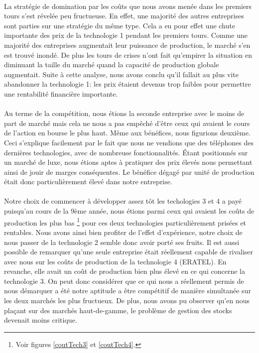 \paragraph{}
La stratégie de domination par les coûts que nous avons menée dans les premiers
tours s'est révelée peu fructueuse. En effet, une majorité des autres 
entreprises sont parties sur une stratégie du même type. Cela a eu pour effet
une chute importante des prix de la technologie 1 pendant les premiers tours. 
Comme une majorité des entreprises augmentait leur puissance de production, 
le marché s'en est trouvé inondé. De plus les tours de crises n'ont fait
qu'empirer la situation en diminuant la taille du marché quand la capacité de
production globale augmentait. Suite à cette analyse, nous avons conclu qu'il 
fallait au plus vite abandonner la technologie 1: les prix étaient devenus trop 
faibles pour permettre une rentabilité financière importante.

\paragraph{}
Au terme de la compétition, nous étions la seconde entreprise avec le moins de
part de marché mais cela ne nous a pas empêché d'être ceux qui avaient le
cours de l'action en bourse le plus haut. Même aux bénéfices, nous figurions
deuxième. Ceci s'explique facilement par le fait que nous ne vendions que des
téléphones des dernières technologies, avec de nombreuse fonctionnalités.
Étant positionnés sur un marché de luxe, nous étions aptes à pratiquer des
prix élevés nous permettant ainsi de jouir de marges conséquentes. Le bénéfice
dégagé par unité de production était donc particulièrement élevé dans notre
entreprise.

\paragraph{}
Notre choix de commencer à développer assez tôt les techologies 3 et 4 a payé
puisqu'au cours de la 9ème année, nous étions parmi ceux qui avaient les coûts
de production les plus bas
\footnote{Voir figures \ref{coutTech3} et \ref{coutTech4}.}
pour ces deux technologies particulièrement prisées et rentables. Nous avons
ainsi bien profiter de l'effet d'expérience, notre choix de nous passer de la
technologie 2 semble donc avoir porté ses fruits. Il est aussi possible de
remarquer qu'une seule entreprise était réellement capable de rivaliser avec
nous sur les coûts de production de la technologie 4 (ERATEL). En revanche,
elle avait un coût de production bien plus élevé en ce qui concerne la
technologie 3. On peut donc considérer que ce qui nous a réellement permis de
nous démarquer a été notre aptitude a être compétitif de manière simultanée
sur les deux marchés les plus fructueux. De plus, nous avons pu observer qu'en
nous plaçant sur des marchés haut-de-gamme, le problème de gestion des stocks
devenait moins critique.


